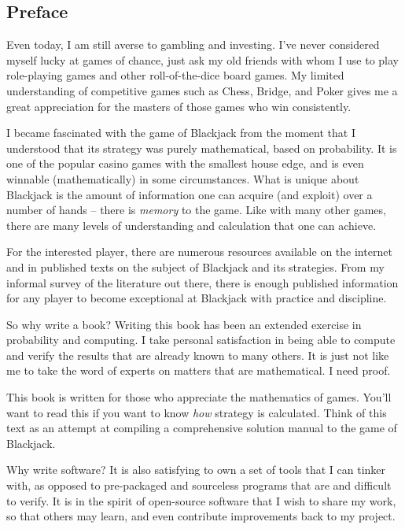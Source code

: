
\subsection*{Preface}

Even today, I am still averse to gambling and investing.
I've never considered myself lucky at games of chance, 
just ask my old friends with whom I use to play role-playing games
and other roll-of-the-dice board games.  
My limited understanding of competitive games such as 
Chess, Bridge, and Poker
gives me a great appreciation for the masters of those games
who win consistently.

I became fascinated with the game of Blackjack from the moment that I 
understood that its strategy was purely mathematical, based on probability.
It is one of the popular casino games with the smallest house edge,
and is even winnable (mathematically) in some circumstances.  
What is unique about Blackjack is the amount 
of information one can acquire (and exploit) over a number of hands --
there is \emph{memory} to the game.  
Like with many other games, there are many levels of understanding
and calculation that one can achieve.

For the interested player, there are numerous resources available
on the internet and in published texts on the subject of Blackjack 
and its strategies.  
From my informal survey of the literature out there, 
there is enough published information for any player to become
exceptional at Blackjack with practice and discipline.  

So why write a book?  
Writing this book has been an extended exercise in
probability and computing.  
I take personal satisfaction in being able to compute
and verify the results that are already known to many others.
It is just not like me to take the word of experts
on matters that are mathematical.
I need proof.

This book is written for those who appreciate the mathematics of games.  
You'll want to read this if you want to know \emph{how}
strategy is calculated.  
Think of this text as an attempt at compiling a comprehensive
solution manual to the game of Blackjack.  

Why write software?
It is also satisfying to own a set of tools that I can tinker with, 
as opposed to pre-packaged and sourceless programs that are
and difficult to verify.
It is in the spirit of open-source software that I wish to share my work, 
so that others may learn, and even contribute improvements
back to my project.

